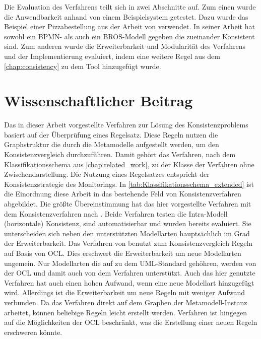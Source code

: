 Die Evaluation des Verfahrens teilt sich in zwei Abschnitte auf.
Zum einen wurde die Anwendbarkeit anhand von einem Beispielsystem getestet.
Dazu wurde das Beispiel einer Pizzabestellung aus der Arbeit von \cite{Schoen} verwendet.
In seiner Arbeit hat \cite{Schoen} sowohl ein BPMN- als auch ein BROS-Modell gegeben die zueinander Konsistent sind.
Zum anderen wurde die Erweiterbarkeit und Modularität des Verfahrens und der Implementierung evaluiert, indem eine weitere Regel aus dem \cref{chap:consistency} zu dem Tool hinzugefügt wurde.

\section{Wissenschaftlicher Beitrag}

Das in dieser Arbeit vorgestellte Verfahren zur Lösung des Konsistenzproblems basiert auf der Überprüfung eines Regelsatz.
Diese Regeln nutzen die Graphstruktur die durch die Metamodelle aufgestellt werden, um den Konsistenzvergleich durchzuführen.
Damit gehört das Verfahren, nach dem Klassifikationsschema aus \cref{chap:related_work}, zu der Klasse der Verfahren ohne Zwischendarstellung.
Die Nutzung eines Regelsatzes entspricht der Konsistenzstrategie des Monitorings.
In \cref{tab:Klassifikationsschema_extended} ist die Einordnung diese Arbeit in das bestehende Feld von Konsistenzverfahren abgebildet.
Die größte Übereinstimmung hat das hier vorgestellte Verfahren mit dem Konsistenzverfahren nach \cite{Egyed2006}.
Beide Verfahren testen die Intra-Modell (horizontale) Konsistenz, sind automatisierbar und wurden bereits evaluiert.
Sie unterscheiden sich neben den unterstützten Modellarten hauptsächlich im Grad der Erweiterbarkeit.
Das Verfahren von \cite{Egyed2006} benutzt zum Konsistenzvergleich Regeln auf Basis von OCL.
Dies erschwert die Erweiterbarkeit um neue Modellarten ungemein.
Nur Modellarten die auf zu dem UML-Standard gehöhren, werden von der OCL und damit auch von dem Verfahren unterstützt.
Auch das hier genutzte Verfahren hat auch einen hohen Aufwand, wenn eine neue Modellart hinzugefügt wird.
Allerdings ist die Erweiterbarkeit um neue Regeln mit weniger Aufwand verbunden.
Da das Verfahren direkt auf dem Graphen der Metamodell-Instanz arbeitet, können beliebige Regeln leicht erstellt werden.
\cite{Egyed2006} Verfahren ist hingegen auf die Möglichkeiten der OCL beschränkt, was die Erstellung einer neuen Regeln erschweren könnte.

